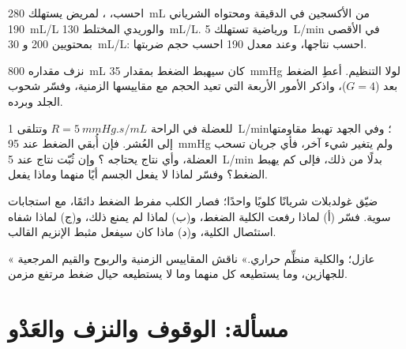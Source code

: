 \begin{exercise}[$\star\star$]\label{exo:b2:blood-pressure:8}
احسب، ،  لمريض
يستهلك \qty{280}{mL} من الأكسجين في الدقيقة ومحتواه الشرياني
\qty{190}{mL/L} والوريدي المختلط \qty{130}{mL/L}. ورياضية
تستهلك \qty{5}{L/min} في الأقصى بمحتويين 200 و
\qty{30}{mL/L}: احسب نتاجها، وعند معدل 190 احسب حجم
ضربتها.
\end{exercise}

\begin{exercise}[$\star\star$]\label{exo:b2:blood-pressure:9}
نزف مقداره \qty{800}{mL} كان سيهبط الضغط
بمقدار \qty{35}{mmHg} لولا التنظيم. أعطِ الضغط بعد  ($G = 4$)،
واذكر الأمور الأربعة التي تعيد الحجم مع مقاييسها
الزمنية، وفسّر شحوب الجلد وبرده.
\end{exercise}

\begin{exercise}[$\star\star\star$]\label{exo:b2:blood-pressure:10}
للعضلة في الراحة $R = \qty{5}{mmHg.s/mL}$ وتتلقى
\qty{1}{L/min}؛ وفي الجهد تهبط مقاومتها إلى العُشر. فإن أُبقي
الضغط عند \qty{95}{mmHg} ولم يتغير شيء آخر،
فأي جريان تسحب العضلة، وأي نتاج يحتاجه ؟
وإن ثُبّت نتاج  عند \qty{5}{L/min} بدلًا من ذلك، فإلى كم
يهبط الضغط؟ وفسّر لماذا لا يفعل الجسم أيًا منهما وماذا
يفعل.
\end{exercise}

\begin{exercise}[$\star\star\star$]\label{exo:b2:blood-pressure:11}
ضيّق غولدبلات شريانًا كلويًا واحدًا؛ فصار الكلب مفرط الضغط
دائمًا، مع استجابات  سوية. فسّر (أ) لماذا رفعت
الكلية الضغط، و(ب) لماذا لم يمنع  ذلك،
و(ج) لماذا شفاه استئصال الكلية، و(د) ماذا كان سيفعل مثبط
الإنزيم القالب.
\end{exercise}

\begin{exercise}[$\star\star\star$]\label{exo:b2:blood-pressure:12}
« عازل؛ والكلية منظِّم حراري.»
ناقش المقاييس الزمنية والربوح والقيم المرجعية للجهازين،
وما يستطيعه كل منهما وما لا يستطيعه حيال ضغط مرتفع مزمن.
\end{exercise}

\section{مسألة: الوقوف والنزف والعَدْو}

